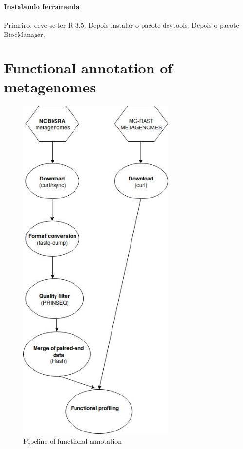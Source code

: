 \documentclass[12pt, a4paper]{report}
\begin{document}
\subsubsection{Instalando ferramenta}
Primeiro, deve-se ter R 3.5. Depois instalar o pacote devtools. Depois o pacote BiocManager. 


\newpage
\chapter{Functional annotation of metagenomes}
\begin{figure}
  \centering 
  \includegraphics[width=0.7\textwidth]{figures/pipeline_functional.jpg}
  \caption{Pipeline of functional annotation}
  \end{figure}
\end{document}
